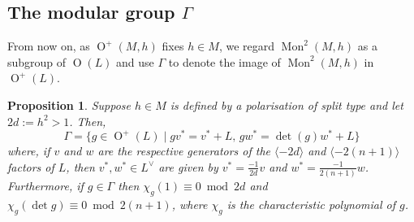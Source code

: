\documentclass[12pt, a4paper]{article}
\newtheorem{proposition}[thm]{Proposition}
\newcommand{\la}{\langle}
\newcommand{\ra}{\rangle}
\newcommand{\opn}{\operatorname}
\begin{document}
\subsection{The modular group $\Gamma$}
From now on, as $\opn{O}^+(M, h)$ fixes $h \in M$, we regard $\opn{Mon}^2(M, h)$ as a subgroup of $\opn{O}(L)$ and use $\Gamma$ to denote the image of $\opn{Mon}^2(M, h)$ in $\opn{O}^+(L)$.  
\begin{proposition}\label{modgp}
  Suppose $h \in M$ is defined by a polarisation of split type and let $2d:=h^2>1$. 
Then,
  \begin{equation}\label{GammaDef}
    \Gamma = \{g \in \opn{O}^+(L) \mid \text{$gv^* = v^* + L$, $gw^* =\opn{det}(g) w^* + L$} \}
  \end{equation}
  where, if $v$ and $w$ are the respective generators of the $\la-2d \ra$ and $\la -2(n+1) \ra$ factors of $L$, then $v^*, w^* \in L^{\vee}$ are given by $v^* = \frac{-1}{2d} v$ and $w^* = \frac{-1}{2(n+1)} w$.
Furthermore, if $g \in \Gamma$ then $\chi_g(1) \equiv 0 \bmod{ 2d}$ and $\chi_g(\opn{det} g) \equiv 0 \bmod{ 2(n+1)}$, where $\chi_g$ is the characteristic polynomial of $g$.
\end{proposition}
\end{document}
